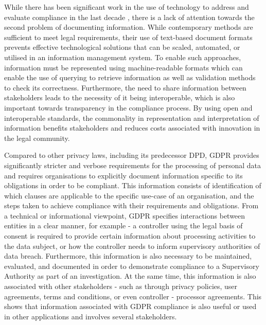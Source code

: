 While there has been significant work in the use of technology to address and evaluate compliance in the last decade \cite{sadiq_modeling_2007,otto_addressing_2007,gordon_rules_2009,fellmann_state---art_2014,benyoucef_information_2015,elgammal_formalizing_2016,kirrane_access_2016}, there is a lack of attention towards the second problem of documenting information.
While contemporary methods are sufficient to meet legal requirements, their use of text-based document formats prevents effective technological solutions that can be scaled, automated, or utilised in an information management system. To enable such approaches, information must be represented using machine-readable formats which can enable the use of querying to retrieve information as well as validation methods to check its correctness. Furthermore, the need to share information between stakeholders leads to the necessity of it being interoperable, which is also important towards transparency in the compliance process. By using open and interoperable standards, the commonality in representation and interpretation of information benefits stakeholders and reduces costs associated with innovation in the legal community. 

Compared to other privacy laws, including its predecessor DPD, GDPR provides significantly stricter and verbose requirements for the processing of personal data and requires organisations to explicitly document information specific to its obligations in order to be compliant.
This information consists of identification of which clauses are applicable to the specific use-case of an organisation, and the steps taken to achieve compliance with their requirements and obligations.
From a technical or informational viewpoint, GDPR specifies interactions between entities in a clear manner, for example - a controller using the legal basis of consent is required to provide certain information about processing activities to the data subject, or how the controller needs to inform supervisory authorities of data breach. Furthermore, this information is also necessary to be maintained, evaluated, and documented in order to demonstrate compliance to a Supervisory Authority as part of an investigation. At the same time, this information is also associated with other stakeholders - such as through privacy policies, user agreements, terms and conditions, or even controller - processor agreements. This shows that information associated with GDPR compliance is also useful or used in other applications and involves several stakeholders.


